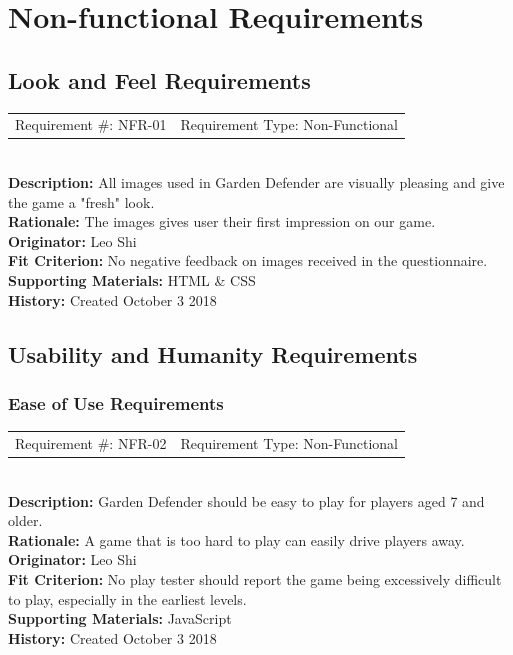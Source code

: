 \documentclass[12pt, titlepage]{article}
\begin{document}
\section{Non-functional Requirements}

\subsection{Look and Feel Requirements}

\begin{reqbox}
	\begin{tabular}{cc}
		Requirement \#: NFR-01 & Requirement Type: Non-Functional \\
	\end{tabular} \\
	\textbf{Description:} All images used in Garden Defender are visually pleasing and give the game a "fresh" look. \\
	\textbf{Rationale:}  The images gives user their first impression on our game. \\
	\textbf{Originator:} Leo Shi\\
	\textbf{Fit Criterion:} No negative feedback on images received in the
questionnaire.\\
	\textbf{Supporting Materials:} HTML & CSS \\
	\textbf{History:} Created October 3 2018
\end{reqbox}

\subsection{Usability and Humanity Requirements}
\subsubsection{Ease of Use Requirements}

\begin{reqbox}
	\begin{tabular}{cc}
		Requirement \#: NFR-02 & Requirement Type: Non-Functional \\
	\end{tabular} \\
	\textbf{Description:} Garden Defender should be easy to play for players aged 7 and older. \\
	\textbf{Rationale:}  A game that is too hard to play can easily drive players away.\\
	\textbf{Originator:} Leo Shi\\
	\textbf{Fit Criterion:} No play tester should report the game being excessively difficult to play, especially in the earliest levels. \\
	\textbf{Supporting Materials:} JavaScript \\
	\textbf{History:} Created October 3 2018
\end{reqbox}
\end{document}
